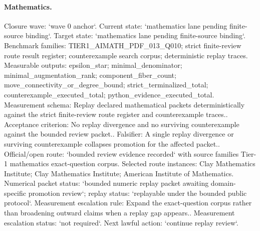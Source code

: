 \paragraph{Mathematics.}
Closure wave: `wave 0 anchor`. Current state: `mathematics lane pending finite-source binding`. Target state: `mathematics lane pending finite-source binding`.
Benchmark families: TIER1\_AIMATH\_PDF\_013\_Q010; strict finite-review route result register; counterexample search corpus; deterministic replay traces.
Measurable outputs: epsilon\_star; minimal\_denominator; minimal\_augmentation\_rank; component\_fiber\_count; move\_connectivity\_or\_degree\_bound; strict\_terminalized\_total; counterexample\_executed\_total; python\_evidence\_executed\_total.
Measurement schema: Replay declared mathematical packets deterministically against the strict finite-review route register and counterexample traces..
Acceptance criterion: No replay divergence and no surviving counterexample against the bounded review packet..
Falsifier: A single replay divergence or surviving counterexample collapses promotion for the affected packet..
Official/open route: `bounded review evidence recorded` with source families Tier-1 mathematics exact-question corpus.
Selected route instances: Clay Mathematics Institute; Clay Mathematics Institute; American Institute of Mathematics.
Numerical packet status: `bounded numeric replay packet awaiting domain-specific promotion review`; replay status: `replayable under the bounded public protocol`.
Measurement escalation rule: Expand the exact-question corpus rather than broadening outward claims when a replay gap appears..
Measurement escalation status: `not required`.
Next lawful action: `continue replay review`.

